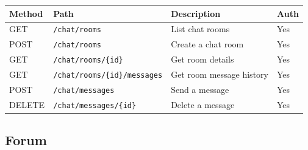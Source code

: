 \documentclass[10pt,a4paper]{report}
\begin{document}
\begin{longtable}{|l|p{4.5cm}|p{5cm}|l|}
    \hline
    \textbf{Method} & \textbf{Path}                           & \textbf{Description}             & \textbf{Auth} \\
    \hline
    \endhead
    GET             & \texttt{/chat/rooms}                    & List chat rooms                  & Yes           \\
    \hline
    POST            & \texttt{/chat/rooms}                    & Create a chat room               & Yes           \\
    \hline
    GET             & \texttt{/chat/rooms/\{id\}}             & Get room details                 & Yes           \\
    \hline
    GET             & \texttt{/chat/rooms/\{id\}/messages}    & Get room message history         & Yes           \\
    \hline
    POST            & \texttt{/chat/messages}                 & Send a message                   & Yes           \\
    \hline
    DELETE          & \texttt{/chat/messages/\{id\}}          & Delete a message                 & Yes           \\
    \hline
\end{longtable}

\subsection{Forum}
\end{document}
